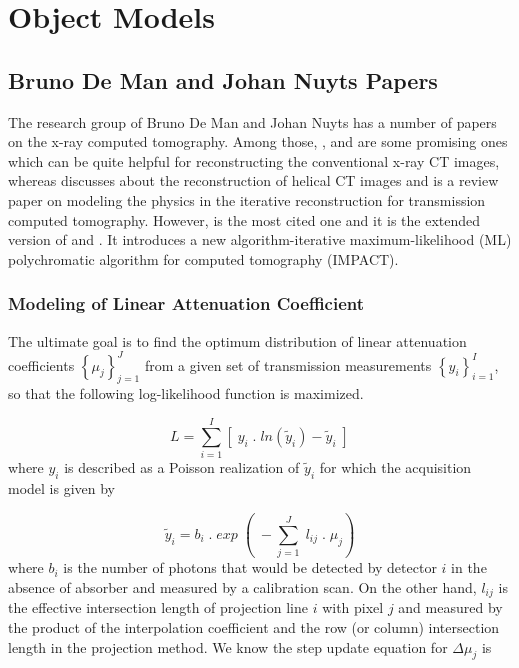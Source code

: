 \chapter{Object Models}

\section{Bruno De Man and Johan Nuyts Papers}
The research group of Bruno De Man and Johan Nuyts has a number of papers on the x-ray computed tomography. Among those, \cite{de1999metal}, \cite{de2000reduction} and \cite{de2001iterative} are some promising ones which can be quite helpful for reconstructing the conventional x-ray CT images, whereas \cite{nuyts1998iterative} discusses about the reconstruction of helical CT images  and \cite{nuyts2013modelling} is a review paper on modeling the physics in the iterative reconstruction for transmission computed tomography. However, \cite{de2001iterative} is the most cited one and it is the extended version of \cite{de2000reduction} and \cite{nuyts1997iterative}. It introduces a new algorithm-iterative maximum-likelihood (ML) polychromatic algorithm for computed tomography (IMPACT).

\subsection{Modeling of Linear Attenuation Coefficient}

The ultimate goal is to find the optimum distribution of linear attenuation coefficients $\left \{\mu_{j} \right \}_{j=1}^{J}$ from a given set of transmission measurements $\left \{y_{i} \right \}_{i=1}^{I}$, so that the following log-likelihood 
function is maximized.

%
\begin{equation}
\label{eq0}
L =  \sum\limits_{i=1}^I \left[ \; y_i \; . \; ln(\widetilde{y}_{i}) - \widetilde{y}_{i} \; \right]
\end{equation} where $y_{i}$ is described as a Poisson realization of $\widetilde{y}_{i}$ for which the acquisition model is given by

\begin{equation}
\label{eq1}
\widetilde{y}_{i} =  b_{i} \; . \; exp \; \left( \; -\sum\limits_{j=1}^J \; l_{ij} \; . \; \mu_{j} \right)
\end{equation} where $b_i$ is the number of photons that would be detected by detector $i$ in the absence of absorber and measured by a calibration scan. On the other hand, $l_{ij}$ is the effective intersection length of projection line $i$ with pixel $j$ and measured by the product of the interpolation coefficient and the row (or column) intersection length in the projection method. We know the step update equation for $\Delta \mu_{j}$ is 

